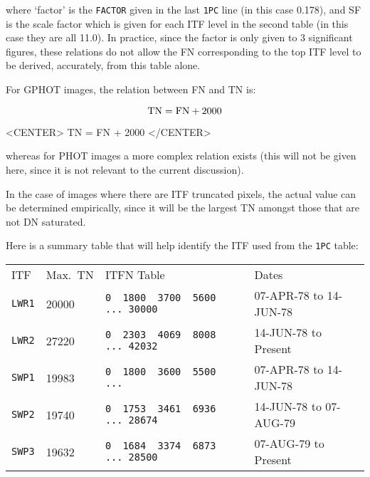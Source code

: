 where `factor' is the \verb+FACTOR+ given in the last \verb+1PC+ line (in this
case 0.178), and SF is the scale factor which is given for each ITF level in
the second table (in this case they are all 11.0)\@.  In practice, since the
factor is only given to 3 significant figures, these relations do not allow the
FN corresponding to the top ITF level to be derived, accurately, from this
table alone.

For GPHOT images, the relation between FN and TN is:

\begin{latexonly}
\begin{displaymath}
{\rm TN} = {\rm FN} + 2000
\end{displaymath}
\end{latexonly}

\begin{htmlonly}
\begin{rawhtml}
<CENTER>
TN = FN + 2000
</CENTER>
\end{rawhtml}
\end{htmlonly}

whereas for PHOT images a more complex relation exists (this will not be given
here, since it is not relevant to the current discussion)\@.

In the case of images where there are ITF truncated pixels, the actual value
can be determined empirically, since it will be the largest TN amongst
those that are not DN saturated.

Here is a summary table that will help identify the ITF used from the
\verb+1PC+ table:

\begin{latexonly}
\begin{tabular}{llll}
ITF        & Max.~TN & ITFN Table                      & Dates\\
{\tt LWR1} & 20000   & \verb+0  1800  3700  5600  ... 30000+ &
                                                07-APR-78 to 14-JUN-78\\
{\tt LWR2} & 27220   & \verb+0  2303  4069  8008  ... 42032+ &
                                                14-JUN-78 to Present\\
{\tt SWP1} & 19983   & \verb+0  1800  3600  5500  ...      + &
                                                07-APR-78 to 14-JUN-78\\
{\tt SWP2} & 19740   & \verb+0  1753  3461  6936  ... 28674+ &
                                                14-JUN-78 to 07-AUG-79\\
{\tt SWP3} & 19632   & \verb+0  1684  3374  6873  ... 28500+ &
                                                07-AUG-79 to Present\\
\end{tabular}
\end{latexonly}

